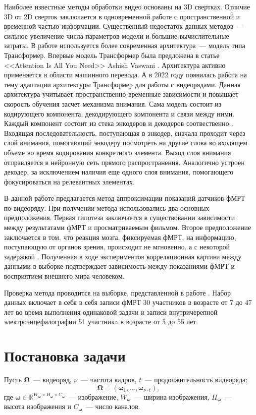 \documentclass[12pt,twoside]{article}
\begin{document}
Наиболее известные методы обработки видео основаны на 3D свертках. 
Отличие 3D от 2D сверток заключается в одновременной работе с пространственной  
и временной частью информации. Существенный недостаток данных методов~--- 
сильное увеличение числа параметров модели и большие вычислительные затраты.
В работе используется более современная архитектура~--- модель типа Трансформер.
Впервые модель Трансформер была предложена в статье <<Attention Is All You Need>> Ashish Vaswani 
\citep{https://doi.org/10.48550/arxiv.1706.03762}. Архитектура активно применяется в области машинного перевода.
А в 2022 году появилась работа \citep{transformer} на тему адаптации архитектуры Трансформер для работы с видеорядами. 
Данная архитектура учитывает пространственно-временные зависимости и повышает скорость обучения засчет механизма внимания.
Сама модель состоит из кодирующего компонента, декодирующего компонента и связи между ними. Каждый компонент состоит из стека 
энкодеров и декодеров соотвественно \citep{badrinarayanan2017segnet}. 
Входящая последовательность, поступающая в энкодер, сначала проходит через слой внимания, помогающий энкодеру 
посмотреть на другие слова во входящем объеме во время кодирования конкретного элемента. 
Выход слоя внимания отправляется в нейронную сеть прямого распространения. 
Аналогично устроен декодер, за исключением наличия еще одного слоя внимания, помогающего фокусироваться на релевантных элементах.

В данной работе предлагается метод аппроксимации показаний датчиков фМРТ по видеоряду. 
При получении метода использовались два основных предположения. Первая гипотеза заключается в существовании зависимости между результатами фМРТ и просматриваемым фильмом.
Второе предположение заключается в том, что реакция мозга, фиксируемая фМРТ, на информацию, поступающую от органов зрения, происходит не мгновенно, а с некоторой задержкой \citep{Demidov}. 
Полученная в ходе экспериментов корреляционная картина между данными в выборке подтверждает 
зависимость между показаниями фМРТ и восприятием внешнего мира человеком. 

Проверка метода проводится на выборке, представленной в работе \citep{Berezutskaya2022}. 
Набор данных включает в себя в себя записи фМРТ 30 участников в возрасте от 7 до 47 лет во время 
выполнения одинаковой задачи и записи внутричерепной электроэнцефалографии 51 участникa в возрасте от 5 до 55 лет. 


\section{Постановка задачи}
Пусть $\mathbf{\Omega}$~--- видеоряд, $\nu$~--- частота кадров, $t$~--- продолжительность видеоряда:
\begin{equation}
    \bm{\Omega} = (\bm{\omega}_{1}, \dots, \bm{\omega}_{\nu \cdot t}),
\end{equation}
где $\bm{\omega} \in \mathbb{R}^{W_{\bm{\omega}} \times H_{\bm{\omega}} \times C_{\bm{\omega}}}$~--- изображение, $W_{\bm{\omega}}$~---
ширина изображения, $H_{\bm{\omega}}$~--- высота изображения и $C_{\bm{\omega}}$~--- число каналов.
\end{document}
